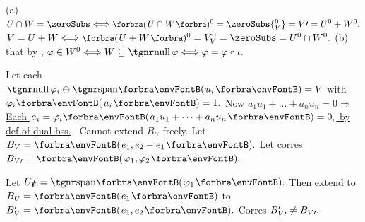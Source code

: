 {%

(a) $U\cap W=\zeroSubs\Longleftrightarrow \BigPar{U\cap W}{^0}=\zeroSubs{_V^0}=V\apostrophe=U^0+W^0.$\parSol{\vspace{1pt}}
\Ha$V=U+W\Longleftrightarrow\BigPar{U+W}{^0}=V_V^0=\zeroSubs=U^0\cap W^0.$\parSol{\vspace{2pt}}
(b)  \NOTICE that by , \;$\varphi\in W^0\Longleftrightarrow W\subseteq\null\varphi\Longleftrightarrow\varphi=\varphi\circ\iota.$\PfEnd
\SepLine

Let each \uline{$\null\varphi_i\oplus\Span{u_i}=V$} with $\varphi_i\Par{u_i}=1.$\parSol{}
Now $a_1u_1+\dots+a_nu_n=0\Rightarrow$ \uline{Each $a_i=\varphi_i\Par{a_1u_1+\dots+a_nu_n}=0,$ by def of dual bss.}\PfEnd\vspace{2pt}
\Example \,\,\,Cannot extend $B_U$ freely. Let $B_V=\Par{e_1,e_2-e_1}.$ Let corres  $B_{V\apostrophe}=\Par{\varphi_1,\varphi_2}.$\par
\Blind{\Example \,\,\,}Let $U_V\upapostrophe=\Span{\varphi_1}.$ Then extend to $B_U=\Par{e_1}$ to $B_V'=\Par{e_1,e_2}.$ Corres $B_{V\prime}'\neq B_{V\prime}.$
\SepLine
}

